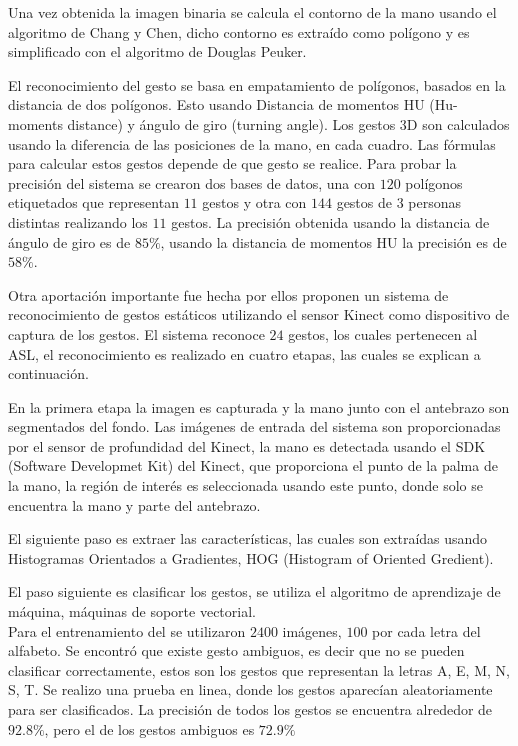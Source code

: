 Una vez obtenida la imagen binaria se calcula el contorno de la mano usando el algoritmo de Chang y Chen, dicho contorno es extraído como polígono y  es simplificado con el algoritmo de Douglas Peuker. 

El reconocimiento del gesto se basa en empatamiento de polígonos, basados en la distancia de dos polígonos. Esto usando Distancia de momentos HU (Hu-moments distance) y ángulo de giro (turning angle). 
Los gestos 3D son calculados usando la diferencia de las posiciones de la mano, en cada cuadro. Las fórmulas para calcular estos gestos depende de que gesto se  realice.  
Para probar la precisión del sistema se crearon dos bases de datos, una con $120$ polígonos etiquetados que representan $11$ gestos y otra con $144$ gestos de $3$ personas distintas realizando los $11$ gestos. La precisión obtenida usando la distancia de ángulo de giro es de $85 \%$, usando la distancia de momentos HU la precisión es de $58 \%$.  


Otra aportación importante fue hecha por \citep{Kang2013} ellos proponen un sistema de reconocimiento de  gestos estáticos utilizando el sensor Kinect como dispositivo de captura de los gestos. El sistema reconoce $24$ gestos, los cuales pertenecen al ASL, el reconocimiento es realizado en cuatro etapas, las cuales se explican a continuación.  

En la primera etapa la imagen es capturada y la mano junto con el antebrazo son segmentados del fondo. Las imágenes de entrada del sistema son proporcionadas por el sensor de profundidad del Kinect, la mano es detectada usando el SDK (Software Developmet Kit) del Kinect, que proporciona el punto de la palma de la mano, la región de interés es seleccionada usando este punto, donde  solo se encuentra la mano y parte del antebrazo.   

El siguiente paso es extraer las características, las cuales son extraídas usando Histogramas Orientados a Gradientes, HOG (Histogram of Oriented Gredient).  

El paso siguiente es clasificar los gestos, se utiliza el algoritmo de aprendizaje de máquina, máquinas de soporte vectorial.\\
Para el entrenamiento del se utilizaron $2400$ imágenes, $100$ por cada letra del alfabeto. Se encontró que existe gesto ambiguos, es decir que no se pueden clasificar correctamente, estos son los gestos que representan la letras A, E, M, N, S, T. 
Se realizo una prueba en linea, donde los gestos aparecían aleatoriamente para ser clasificados. La precisión de todos los gestos se encuentra alrededor de $92.8 \%$, pero el de los gestos ambiguos es $72.9 \%$

